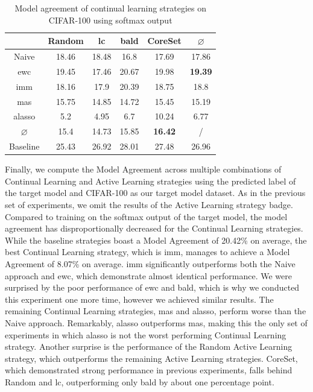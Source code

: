\begin{table}[h]
    \centering
    \begin{tabular}{ c | c c c c | c } 
         & Random & \gls{lc} & \gls{bald} & CoreSet & $\varnothing$\\ 
        \hline
        Naive & 18.46 & 18.48 & 16.8 & 17.69 & 17.86\\
        \gls{ewc} & 19.45 & 17.46 & 20.67 & 19.98 & \textbf{19.39}\\
        \gls{imm} & 18.16 & 17.9 & 20.39 & 18.75 & 18.8\\
        \gls{mas} & 15.75 & 14.85 & 14.72 & 15.45 & 15.19\\
        \gls{alasso} & 5.2 & 4.95 & 6.7 & 10.24 & 6.77\\
        \hline
        $\varnothing$ & 15.4 & 14.73 & 15.85 & \textbf{16.42} & /\\
        Baseline & 25.43 & 26.92 & 28.01 & 27.48 & 26.96 \\
    \end{tabular}
    \caption{Model agreement of continual learning strategies on CIFAR-100 using softmax output}
    \label{fig:ModelStealingCIFAR100Softmax}
\end{table}

Finally, we compute the Model Agreement across multiple combinations of Continual Learning and Active Learning strategies using the predicted label of the target model and CIFAR-100 as our target model dataset. As in the previous set of experiments, we omit the results of
the Active Learning strategy \gls{badge}. Compared to training on the softmax output of the target model, the model agreement has disproportionally decreased for the Continual Learning strategies. While the baseline strategies boast a Model Agreement of 20.42\% on average, the
best Continual Learning strategy, which is \gls{imm}, manages to achieve a Model Agreement of 8.07\% on average. \gls{imm} significantly outperforms both the Naive approach and \gls{ewc}, which demonstrate almost identical performance. We were surprised by the poor performance of \gls{ewc} and \gls{bald},
which is why we conducted this experiment one more time, however we achieved similar results. The remaining Continual Learning strategies, \gls{mas} and \gls{alasso}, perform worse than the Naive approach. Remarkably, \gls{alasso} outperforms \gls{mas}, making this the only set of experiments in which
\gls{alasso} is not the worst performing Continual Learning strategy. Another surprise is the performance of the Random Active Learning strategy, which outperforms the remaining Active Learning strategies. CoreSet, which demonstrated strong performance in previous experiments, falls behind
Random and \gls{lc}, outperforming only \gls{bald} by about one percentage point. \par


